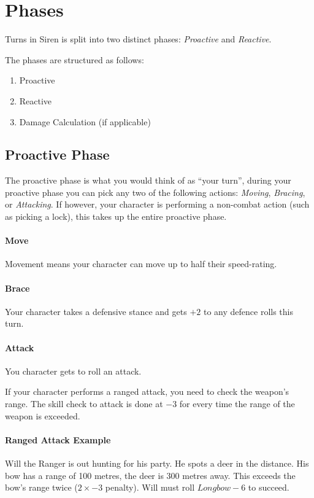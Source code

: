 \section{Phases}\label{sec:phases}
Turns in Siren is split into two distinct phases: \textit{Proactive} and \textit{Reactive}.

The phases are structured as follows:
\begin{enumerate}
  \item Proactive 
  \item Reactive
  \item Damage Calculation (if applicable)
\end{enumerate}

\subsection{Proactive Phase}
The proactive phase is what you would think of as ``your turn'', during your proactive phase you can pick any two of the following actions: \textit{Moving}, \textit{Bracing}, or \textit{Attacking}.
If however, your character is performing a non-combat action (such as picking a lock), this takes up the entire proactive phase.

\paragraph{Move}
Movement means your character can move up to half their speed-rating.

\paragraph{Brace}
Your character takes a defensive stance and gets $+2$ to any defence rolls this turn.

\paragraph{Attack}
You character gets to roll an attack.

If your character performs a ranged attack, you need to check the weapon's range.
The skill check to attack is done at $-3$ for every time the range of the weapon is exceeded.

\paragraph{Ranged Attack Example} Will the Ranger is out hunting for his party. He spots a deer in the distance. His bow has a range of 100 metres, the deer is 300 metres away. This exceeds the bow's range twice ($2\times -3$ penalty). Will must roll $Longbow-6$ to succeed.

